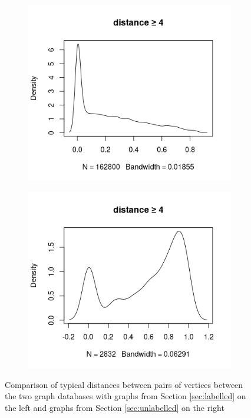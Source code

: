 \documentclass{l4proj}
\theoremstyle{definition}
\theoremstyle{remark}
\begin{document}
\begin{figure}
\begin{subfigure}[t]{0.49\textwidth}
    \centering
    \includegraphics[width=\textwidth]{images/mcs_prop4.png}
  \end{subfigure}
  \begin{subfigure}[t]{0.49\textwidth}
    \centering
    \includegraphics[width=\textwidth]{images/sip_prop4.png}
  \end{subfigure}
  \caption{Comparison of typical distances between pairs of vertices between the
  two graph databases with graphs from Section \ref{sec:labelled} on the left
  and graphs from Section \ref{sec:unlabelled} on the right}
  \label{fig:proportions}
\end{figure}
\end{document}
